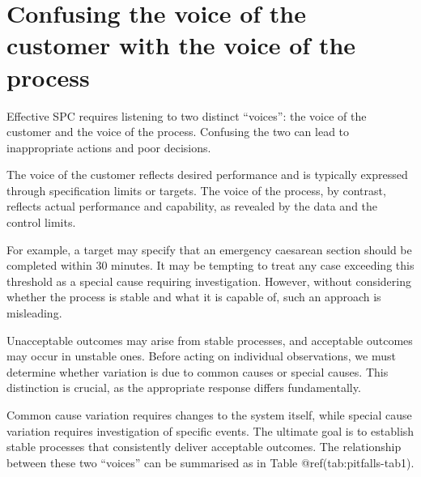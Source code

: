 \documentclass[
]{book}
\begin{document}
\section{Confusing the voice of the customer with the voice of the
process}\label{confusing-the-voice-of-the-customer-with-the-voice-of-the-process}

Effective SPC requires listening to two distinct ``voices'': the voice
of the customer and the voice of the process. Confusing the two can lead
to inappropriate actions and poor decisions.

The voice of the customer reflects desired performance and is typically
expressed through specification limits or targets. The voice of the
process, by contrast, reflects actual performance and capability, as
revealed by the data and the control limits.

For example, a target may specify that an emergency caesarean section
should be completed within 30 minutes. It may be tempting to treat any
case exceeding this threshold as a special cause requiring
investigation. However, without considering whether the process is
stable and what it is capable of, such an approach is misleading.

Unacceptable outcomes may arise from stable processes, and acceptable
outcomes may occur in unstable ones. Before acting on individual
observations, we must determine whether variation is due to common
causes or special causes. This distinction is crucial, as the
appropriate response differs fundamentally.

Common cause variation requires changes to the system itself, while
special cause variation requires investigation of specific events. The
ultimate goal is to establish stable processes that consistently deliver
acceptable outcomes. The relationship between these two ``voices'' can
be summarised as in Table @ref(tab:pitfalls-tab1).
\end{document}
